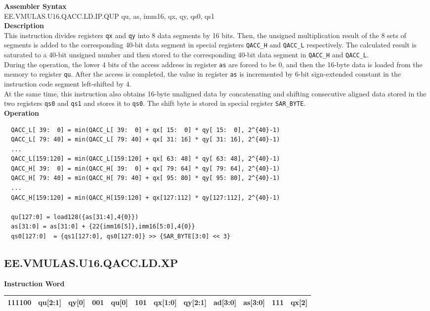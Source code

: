 \textbf{Assembler Syntax} \\
EE.VMULAS.U16.QACC.LD.IP.QUP qu, as, imm16, qx, qy, qs0, qs1 \\
\textbf{Description} \\
This instruction divides registers \lstinline{qx} and \lstinline{qy} into 8 data segments by 16 bits. Then, the unsigned multiplication result of the 8 sets of segments is added to the corresponding 40-bit data segment in special registers \lstinline{QACC_H} and \lstinline{QACC_L} respectively. The calculated result is saturated to a 40-bit unsigned number and then stored to the corresponding 40-bit data segment in \lstinline{QACC_H} and \lstinline{QACC_L}.\\
During the operation, the lower 4 bits of the access address in register \lstinline{as} are forced to be 0, and then the 16-byte data is loaded from the memory to register \lstinline{qu}. After the access is completed, the value in register \lstinline{as} is incremented by 6-bit sign-extended constant in the instruction code segment left-shifted by 4.\\
At the same time, this instruction also obtains 16-byte unaligned data by concatenating and shifting consecutive aligned data stored in the two registers \lstinline{qs0} and \lstinline{qs1} and stores it to \lstinline{qs0}. The shift byte is stored in special register \lstinline{SAR_BYTE}.\\
\textbf{Operation}
\begin{lstlisting}
  QACC_L[ 39:  0] = min(QACC_L[ 39:  0] + qx[ 15:  0] * qy[ 15:  0], 2^{40}-1)
  QACC_L[ 79: 40] = min(QACC_L[ 79: 40] + qx[ 31: 16] * qy[ 31: 16], 2^{40}-1)
  ...
  QACC_L[159:120] = min(QACC_L[159:120] + qx[ 63: 48] * qy[ 63: 48], 2^{40}-1)
  QACC_H[ 39:  0] = min(QACC_H[ 39:  0] + qx[ 79: 64] * qy[ 79: 64], 2^{40}-1)
  QACC_H[ 79: 40] = min(QACC_H[ 79: 40] + qx[ 95: 80] * qy[ 95: 80], 2^{40}-1)
  ...
  QACC_H[159:120] = min(QACC_H[159:120] + qx[127:112] * qy[127:112], 2^{40}-1)

  qu[127:0] = load128({as[31:4],4{0}})
  as[31:0] = as[31:0] + {22{imm16[5]},imm16[5:0],4{0}}
  qs0[127:0]  = {qs1[127:0], qs0[127:0]} >> {SAR_BYTE[3:0] << 3}
\end{lstlisting}

\clearpage
\subsection{EE.VMULAS.U16.QACC.LD.XP}\label{instruction:EEVMULASU16QACCLDXP}
\setlength\tabcolsep{6pt}
\textbf{Instruction Word} \\
\begin{tabular}{|c|c|c|c|c|c|c|c|c|c|c|c|}
	\hline
	111100 & qu[2:1] & qy[0] & 001 & qu[0] & 101 & qx[1:0] & qy[2:1] & ad[3:0] & as[3:0] & 111 & qx[2] \\
	\hline
\end{tabular}

